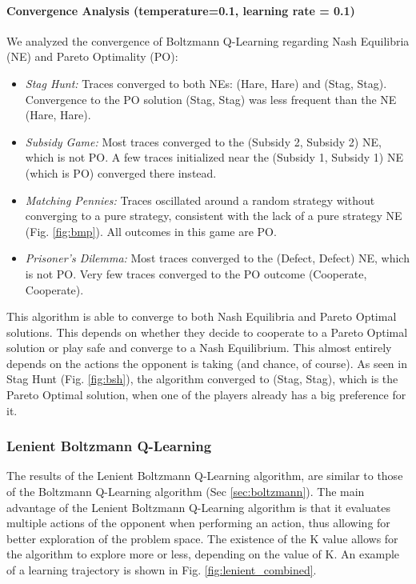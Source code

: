 \documentclass[12pt,a4paper, onecolumn]{exam}
\begin{document}
\paragraph{Convergence Analysis (temperature=0.1, learning rate = 0.1)}
We analyzed the convergence of Boltzmann Q-Learning regarding Nash Equilibria (NE) and Pareto Optimality (PO):

\begin{itemize}
    \item \textit{Stag Hunt:} Traces converged to both NEs: (Hare, Hare) and (Stag, Stag).
          Convergence to the PO solution (Stag, Stag) was less frequent than the NE (Hare, Hare).
    \item \textit{Subsidy Game:} Most traces converged to the (Subsidy 2, Subsidy 2) NE, which is not PO.
          A few traces initialized near the (Subsidy 1, Subsidy 1) NE (which is PO) converged there instead.
    \item \textit{Matching Pennies:} Traces oscillated around a random strategy without converging to a pure strategy, consistent
          with the lack of a pure strategy NE (Fig. \ref{fig:bmp}). All outcomes in this game are PO.
    \item \textit{Prisoner's Dilemma:} Most traces converged to the (Defect, Defect) NE, which is not PO.
          Very few traces converged to the PO outcome (Cooperate, Cooperate).
\end{itemize}

This algorithm is able to converge to both Nash Equilibria and Pareto Optimal solutions. This depends on whether they decide to cooperate to
a Pareto Optimal solution or play safe and converge to a Nash Equilibrium. This almost entirely depends on the actions the opponent is taking
(and chance, of course). As seen in Stag Hunt (Fig. \ref{fig:bsh}), the algorithm converged to (Stag, Stag), which is the Pareto Optimal solution,
when one of the players already has a big preference for it.

\subsubsection{Lenient Boltzmann Q-Learning} \label{sec:lenient}

The results of the Lenient Boltzmann Q-Learning algorithm, are similar to those of the Boltzmann Q-Learning algorithm (Sec \ref{sec:boltzmann}).
The main advantage of the Lenient Boltzmann Q-Learning algorithm is that it evaluates multiple actions of the opponent when performing
an action, thus allowing for better exploration of the problem space. The existence of the K value allows for the algorithm to explore more or less,
depending on the value of K. An example of a learning trajectory is shown in Fig. \ref{fig:lenient_combined}.
\end{document}
